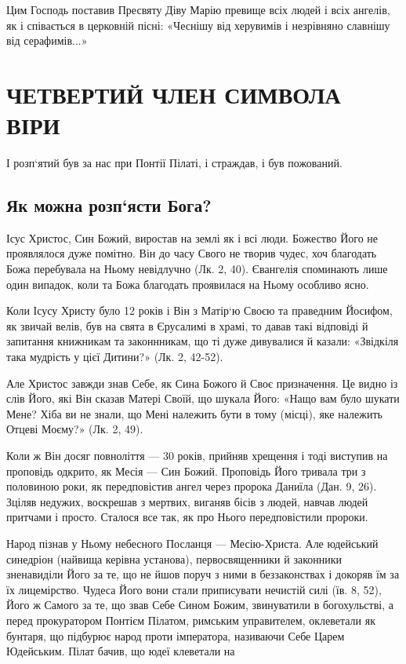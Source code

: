 \documentclass[main.tex]{subfiles}
\begin{document}
Цим Господь поставив Пресвяту Діву Марію превище всіх людей і всіх ангелів, як і співається в церковній пісні: «Чеснішу від херувимів і незрівняно славнішу від серафимів...»

\section{ЧЕТВЕРТИЙ ЧЛЕН СИМВОЛА ВІРИ}

І розп`ятий був за нас при Понтії Пілаті, і страждав, і був пожований.

\subsection{Як можна розп`ясти Бога?}

Ісус Христос, Син Божий, виростав на землі як і всі люди. Божество Його не проявлялося дуже помітно. Він до часу Свого не творив чудес, хоч благодать Божа перебувала на Ньому невідлучно (Лк. 2, 40). Євангелія споминають лише один випадок, коли та Божа благодать проявилася на Ньому особливо ясно.

Коли Ісусу Христу було 12 років і Він з Матір`ю Своєю та праведним Йосифом, як звичай велів, був на свята в Єрусалимі в храмі, то давав такі відповіді й запитання книжникам та законнникам, що ті дуже дивувалися й казали: «Звідкіля така мудрість у цієї Дитини?» (Лк. 2, 42-52).

Але Христос завжди знав Себе, як Сина Божого й Своє призначення. Це видно із слів Його, які Він сказав Матері Своїй, що шукала Його: «Нащо вам було шукати Мене? Хіба ви не знали, що Мені належить бути в тому (місці), яке належить Отцеві Моєму?» (Лк. 2, 49).

Коли ж Він досяг повноліття — 30 років, прийняв хрещення і тоді виступив на проповідь одкрито, як Месія — Син Божий. Проповідь Його тривала три з половиною роки, як передповістив ангел через пророка Даниїла (Дан. 9, 26). Зціляв недужих, воскрешав з мертвих, виганяв бісів з людей, навчав людей притчами і просто. Сталося все так, як про Нього передповістили пророки.

Народ пізнав у Ньому небесного Посланця — Месію-Христа. Але юдейський синедріон (найвища керівна установа), первосвященники й законники зненавиділи Його за те, що не йшов поруч з ними в беззаконствах і докоряв їм за їх лицемірство. Чудеса Його вони стали приписувати нечистій силі (їв. 8, 52), Його ж Самого за те, що звав Себе Сином Божим, звинуватили в богохульстві, а перед прокуратором Понтієм Пілатом, римським управителем, оклеветали як бунтаря, що підбурює народ проти імператора, називаючи Себе Царем Юдейським. Пілат бачив, що юдеї клеветали на
 
\end{document}
